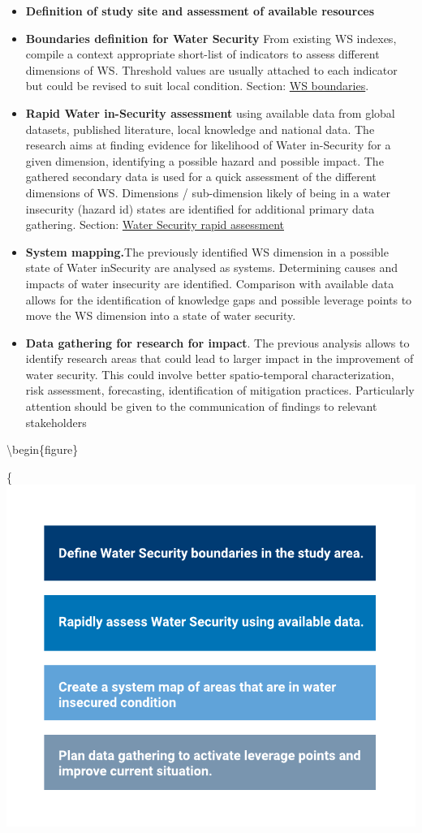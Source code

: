 \documentclass[
]{book}
\begin{document}
\begin{itemize}
\item
  \textbf{Definition of study site and assessment of available resources}
\item
  \textbf{Boundaries definition for Water Security}
  From existing WS indexes, compile a context appropriate short-list of indicators to assess different dimensions of WS.
  Threshold values are usually attached to each indicator but could be revised to suit local condition. Section: \protect\hyperlink{boundaries}{WS boundaries}.
\item
  \textbf{Rapid Water in-Security assessment} using available data from global datasets, published literature, local knowledge and national data. The research aims at finding evidence for likelihood of Water in-Security for a given dimension, identifying a possible hazard and possible impact. The gathered secondary data is used for a quick assessment of the different dimensions of WS. Dimensions / sub-dimension likely of being in a water insecurity (hazard id) states are identified for additional primary data gathering. Section: \protect\hyperlink{water-security-rapid-assessment}{Water Security rapid assessment}
\item
  \textbf{System mapping.}The previously identified WS dimension in a possible state of Water inSecurity are analysed as systems. Determining causes and impacts of water insecurity are identified. Comparison with available data allows for the identification of knowledge gaps and possible leverage points to move the WS dimension into a state of water security.
\item
  \textbf{Data gathering for research for impact}. The previous analysis allows to identify research areas that could lead to larger impact in the improvement of water security. This could involve better spatio-temporal characterization, risk assessment, forecasting, identification of mitigation practices. Particularly attention should be given to the communication of findings to relevant stakeholders
\end{itemize}

\textbackslash begin\{figure\}

\{\centering \includegraphics[width=0.4\linewidth]{images/WSCOAT_process}
\end{document}
